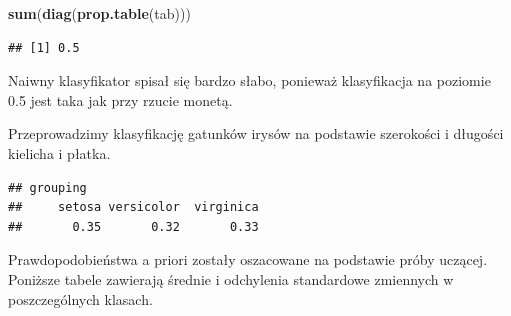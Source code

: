 \documentclass[
]{book}
\newenvironment{Shaded}{\begin{snugshade}}{\end{snugshade}}
\newcommand{\DataTypeTok}[1]{\textcolor[rgb]{0.13,0.29,0.53}{#1}}
\newcommand{\DecValTok}[1]{\textcolor[rgb]{0.00,0.00,0.81}{#1}}
\newcommand{\KeywordTok}[1]{\textcolor[rgb]{0.13,0.29,0.53}{\textbf{#1}}}
\newcommand{\NormalTok}[1]{#1}
\newcommand{\OperatorTok}[1]{\textcolor[rgb]{0.81,0.36,0.00}{\textbf{#1}}}
\newcommand{\StringTok}[1]{\textcolor[rgb]{0.31,0.60,0.02}{#1}}
\theoremstyle{plain}
\theoremstyle{definition}
\theoremstyle{definition}
\theoremstyle{definition}
\theoremstyle{definition}
\theoremstyle{remark}
\let\BeginKnitrBlock\begin \let\EndKnitrBlock\end
\begin{document}
\begin{Shaded}
\begin{Highlighting}[]
\KeywordTok{sum}\NormalTok{(}\KeywordTok{diag}\NormalTok{(}\KeywordTok{prop.table}\NormalTok{(tab)))}
\end{Highlighting}
\end{Shaded}

\begin{verbatim}
## [1] 0.5
\end{verbatim}

Naiwny klasyfikator spisał się bardzo słabo, ponieważ klasyfikacja na poziomie 0.5 jest taka jak przy rzucie monetą.

\BeginKnitrBlock{example}
\protect\hypertarget{exm:unnamed-chunk-78}{}{\label{exm:unnamed-chunk-78} }Przeprowadzimy klasyfikację gatunków irysów na podstawie szerokości i długości kielicha i płatka.
\EndKnitrBlock{example}

\begin{Shaded}
\end{Shaded}

\begin{verbatim}
## grouping
##     setosa versicolor  virginica 
##       0.35       0.32       0.33
\end{verbatim}

Prawdopodobieństwa a priori zostały oszacowane na podstawie próby uczącej. Poniższe tabele zawierają średnie i odchylenia standardowe zmiennych w poszczególnych klasach.

\begin{Shaded}
\end{Shaded}
\end{document}
